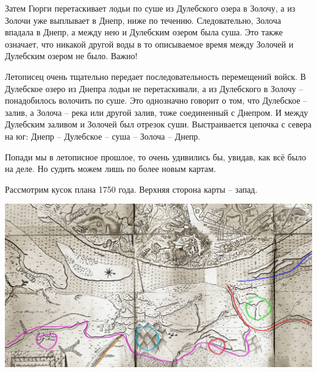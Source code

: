
Затем Гюрги перетаскивает лодьи по суше из Дулебского озера в Золочу, а из Золочи уже выплывает в Днепр, ниже по течению. Следовательно, Золоча впадала в Днепр, а между нею и Дулебским озером была суша. Это также означает, что никакой другой воды в то описываемое время между Золочей и Дулебским озером не было. Важно!

Летописец очень тщательно передает последовательность перемещений войск. В Дулебское озеро из Днепра лодьи не перетаскивали, а из Дулебского в Золочу – понадобилось волочить по суше. Это однозначно говорит о том, что Дулебское – залив, а Золоча – река или другой залив, тоже соединенный с Днепром. И между Дулебским заливом и Золочей был отрезок суши. Выстраивается цепочка с севера на юг: Днепр – Дулебское – суша – Золоча – Днепр.






Попади мы в летописное прошлое, то очень удивились бы, увидав, как всё было на деле. Но судить можем лишь по более новым картам.

Рассмотрим кусок плана 1750 года. Верхняя сторона карты – запад.

\begin{center}
\includegraphics[width=\linewidth]{chast-gorodki/terbin/1750-telbin-new.jpg}
\end{center}

